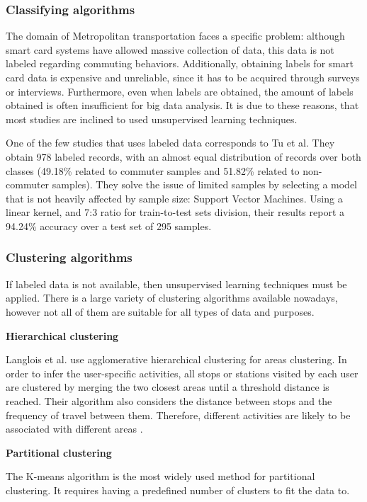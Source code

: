 \documentclass{article}
\begin{document}
\subsubsection{Classifying algorithms}
The domain of Metropolitan transportation faces a specific problem: although smart card systems have allowed massive collection of data, this data is not labeled regarding commuting behaviors. Additionally, obtaining labels for smart card data is expensive and unreliable, since it has to be acquired through surveys or interviews. Furthermore, even when labels are obtained, the amount of labels obtained is often insufficient for big data analysis. It is due to these reasons, that most studies are inclined to used unsupervised learning techniques. 

One of the few studies that uses labeled data corresponds to Tu et al. They obtain 978 labeled records, with an almost equal distribution of records over both classes (49.18\% related to commuter samples and 51.82\% related to non-commuter samples). They solve the issue of limited samples by selecting a model that is not heavily affected by sample size: Support Vector Machines. Using a linear kernel, and 7:3 ratio for train-to-test sets division, their results report a 94.24\% accuracy over a test set of 295 samples. 

\subsubsection{Clustering algorithms} 
If labeled data is not available, then unsupervised learning techniques must be applied. There is a large variety of clustering algorithms available nowadays, however not all of them are suitable for all types of data and purposes.

\textbf{Hierarchical clustering}

Langlois et al. use agglomerative hierarchical clustering for areas clustering. In order to infer the user-specific activities, all stops or stations visited by each user are clustered by merging the two closest areas until a threshold distance is reached. Their algorithm also considers the distance between stops and the frequency of travel between them. Therefore, different activities are likely to be associated with different areas \cite{langlois2016inferring}.

\textbf{Partitional clustering}

The K-means algorithm is the most widely used method for partitional clustering. It requires having a predefined number of clusters to fit the data to. 
\end{document}
